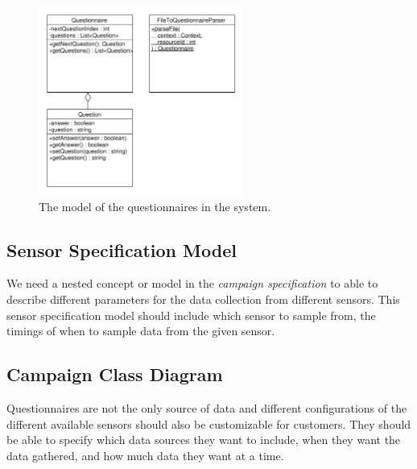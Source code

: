\begin{figure}[!htbp]
	\centering
	\includegraphics[width=0.6\textwidth]{graphic/data_modeling/questionnaire.pdf}
	\caption{The model of the questionnaires in the system.}
	\label{fig:questionnaire_model}
\end{figure}
\FloatBarrier

\subsection{Sensor Specification Model}
\label{sub:sensor_specification_model}

We need a nested concept or model in the \textit{campaign specification} to able to describe different parameters for the data collection from different sensors. This sensor specification model should include which sensor to sample from, the timings of when to sample data from the given sensor. 


\subsection{Campaign Class Diagram}
\label{sub:campagin_class_diagram}

Questionnaires are not the only source of data and different configurations of the different available sensors should also be customizable for customers. They should be able to specify which data sources they want to include, when they want the data gathered, and how much data they want at a time. 

